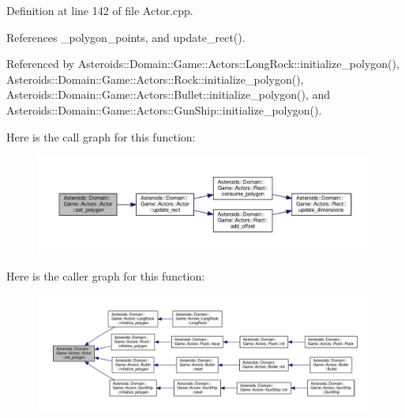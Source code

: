 Definition at line 142 of file Actor.\+cpp.



References \+\_\+polygon\+\_\+points, and update\+\_\+rect().



Referenced by Asteroids\+::\+Domain\+::\+Game\+::\+Actors\+::\+Long\+Rock\+::initialize\+\_\+polygon(), Asteroids\+::\+Domain\+::\+Game\+::\+Actors\+::\+Rock\+::initialize\+\_\+polygon(), Asteroids\+::\+Domain\+::\+Game\+::\+Actors\+::\+Bullet\+::initialize\+\_\+polygon(), and Asteroids\+::\+Domain\+::\+Game\+::\+Actors\+::\+Gun\+Ship\+::initialize\+\_\+polygon().

Here is the call graph for this function\+:\nopagebreak
\begin{figure}[H]
\begin{center}
\leavevmode
\includegraphics[width=350pt]{classAsteroids_1_1Domain_1_1Game_1_1Actors_1_1Actor_a224abd0a9dff102361ce2a305ba4734f_cgraph}
\end{center}
\end{figure}
Here is the caller graph for this function\+:\nopagebreak
\begin{figure}[H]
\begin{center}
\leavevmode
\includegraphics[width=350pt]{classAsteroids_1_1Domain_1_1Game_1_1Actors_1_1Actor_a224abd0a9dff102361ce2a305ba4734f_icgraph}
\end{center}
\end{figure}
\mbox{\label{classAsteroids_1_1Domain_1_1Game_1_1Actors_1_1Actor_aa572cc87c0d07330348c811d778aa314}} 
